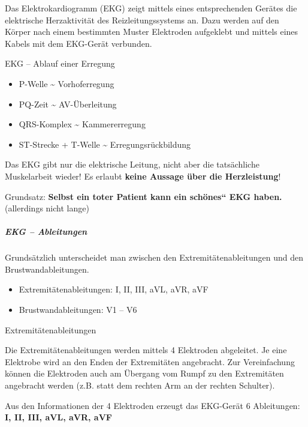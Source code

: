 \documentclass{article}
\newcommand\gEs[1]{\textbf{\textcolor[rgb]{0.0,0.0,0.5019608}{#1}}}
\newcommand\gEs[1]{\textbf{\textcolor[rgb]{0.0,0.0,0.5019608}{#1}}}
\newcommand\gZ[1]{\textcolor[rgb]{0.5019608,0.5019608,0.5019608}{#1}}
\begin{document}
{\mdseries
Das Elektrokardiogramm (EKG) zeigt mittels eines entsprechenden
Ger\"ates die elektrische Herzaktivit\"at des Reizleitungssystems an.
Dazu werden auf den K\"orper nach einem bestimmten Muster Elektroden
aufgeklebt und mittels eines Kabels mit dem EKG-Ger\"at verbunden. }

{\mdseries
\gZ{EKG -- Ablauf einer Erregung}}

\begin{itemize}
\item \gZ{P-Welle \~{} Vorhoferregung}

\item \gZ{PQ-Zeit \~{} AV-\"Uberleitung}

\item \gZ{QRS-Komplex \~{} Kammererregung}

\item \gZ{ST-Strecke + T-Welle \~{}
Erregungsr\"uckbildung}

\end{itemize}
{\mdseries\color{black}
Das EKG gibt nur die elektrische Leitung, nicht aber die tats\"achliche
Muskelarbeit wieder! Es erlaubt \gEs{keine Aussage
\"uber die Herzleistung}! }

{\mdseries\color{black}
Grundsatz: \gEs{Selbst ein
}\gEs{toter}\gEs{ Patient kann
ein {\quotedblbase}sch\"ones{\textquotedblleft} EKG haben. }(allerdings
nicht lange)}

\subparagraph{EKG -- Ableitungen}
{\mdseries
Grunds\"atzlich unterscheidet man zwischen den Extremit\"atenableitungen
und den Brustwandableitungen. }

\begin{itemize}
\item {\mdseries
Extremit\"atenableitungen: I, II, III, aVL, aVR, aVF}

\item {\mdseries
Brustwandableitungen: V1 -- V6}

\end{itemize}
{\mdseries\color{black}
Extremit\"atenableitungen}

{\mdseries
Die Extremit\"atenableitungen werden mittels 4 Elektroden abgeleitet. Je
eine Elektrobe wird an den Enden der Extremit\"aten angebracht. Zur
Vereinfachung k\"onnen die Elektroden auch am \"Ubergang vom Rumpf zu
den Extremit\"aten angebracht werden (z.B. statt dem rechten Arm an der
rechten Schulter).}

{\mdseries
Aus den Informationen der 4 Elektroden erzeugt das EKG-Ger\"at
\gZ{6} Ableitungen:  \gZ{\textbf{I,
II, III, aVL, aVR, aVF}} }
\end{document}
